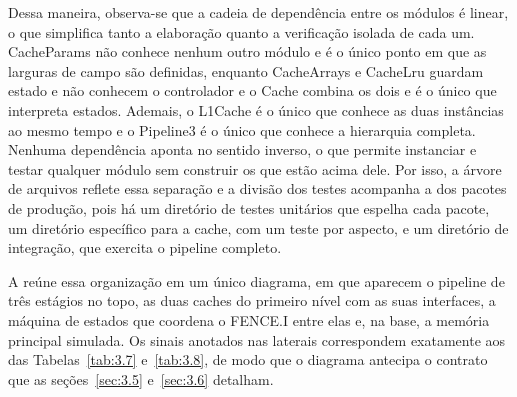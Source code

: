 Dessa maneira, observa-se que a cadeia de dependência entre os módulos é linear, o que simplifica tanto a elaboração quanto a verificação isolada de cada um. CacheParams não conhece nenhum outro módulo e é o único ponto em que as larguras de campo são definidas, enquanto CacheArrays e CacheLru guardam estado e não conhecem o controlador e o Cache combina os dois e é o único que interpreta estados. Ademais, o L1Cache é o único que conhece as duas instâncias ao mesmo tempo e o Pipeline3 é o único que conhece a hierarquia completa. Nenhuma dependência aponta no sentido inverso, o que permite instanciar e testar qualquer módulo sem construir os que estão acima dele. Por isso, a árvore de arquivos reflete essa separação e a divisão dos testes acompanha a dos pacotes de produção, pois há um diretório de testes unitários que espelha cada pacote, um diretório específico para a cache, com um teste por aspecto, e um diretório de integração, que exercita o pipeline completo.

A  reúne essa organização em um único diagrama, em que aparecem o pipeline de três estágios no topo, as duas caches do primeiro nível com as suas interfaces, a máquina de estados que coordena o FENCE.I entre elas e, na base, a memória principal simulada. Os sinais anotados nas laterais correspondem exatamente aos das Tabelas~\ref{tab:3.7} e~\ref{tab:3.8}, de modo que o diagrama antecipa o contrato que as seções~\ref{sec:3.5} e~\ref{sec:3.6} detalham.


